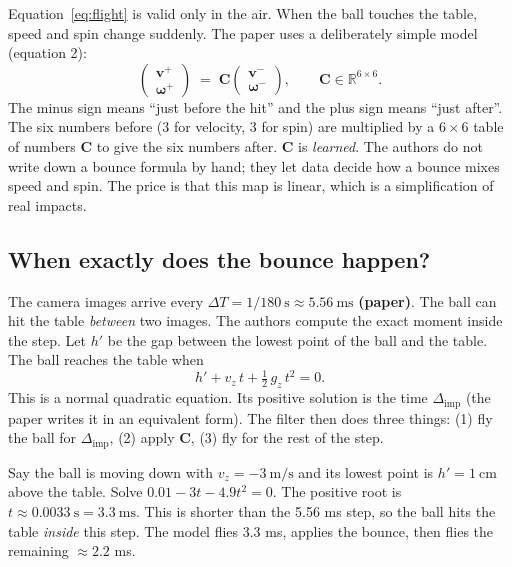 \documentclass[11pt,a4paper]{article}
\newcommand{\vv}{\mathbf{v}}
\newcommand{\ww}{\boldsymbol{\omega}}
\begin{document}
Equation~\eqref{eq:flight} is valid only in the air. When the ball touches the table, speed and
spin change suddenly. The paper uses a deliberately simple model (equation 2):
\begin{equation}
\begin{pmatrix}\vv^{+}\\ \ww^{+}\end{pmatrix}
\;=\; \mathbf C\begin{pmatrix}\vv^{-}\\ \ww^{-}\end{pmatrix},
\qquad \mathbf C\in\mathbb R^{6\times 6}.
\tag{P2}
\end{equation}
\noindent The minus sign means ``just before the hit'' and the plus sign means ``just after''. The
six numbers before (3 for velocity, 3 for spin) are multiplied by a $6\times6$ table of
numbers $\mathbf C$ to give the six numbers after. $\mathbf C$ is \emph{learned}. The authors
do not write down a bounce formula by hand; they let data decide how a bounce mixes speed and
spin. The price is that this map is linear, which is a simplification of real impacts.

\subsection*{When exactly does the bounce happen?}
The camera images arrive every $\Delta T = 1/180\ \text{s}\approx 5.56\ \text{ms}$ \textbf{(paper)}.
The ball can hit the table \emph{between} two images. The authors compute the exact moment
inside the step. Let $h'$ be the gap between the lowest point of the ball and the table. The ball
reaches the table when
\begin{equation*}
h' + v_z\,t + \tfrac12\,g_z\,t^2 = 0 .
\end{equation*}
\noindent This is a normal quadratic equation. Its positive solution is the time $\Delta_{\text{imp}}$ (the
paper writes it in an equivalent form). The filter then does three things: (1) fly the ball
for $\Delta_{\text{imp}}$, (2) apply $\mathbf C$, (3) fly for the rest of the step.

\begin{toy}
Say the ball is moving down with $v_z=-3\ \text{m/s}$ and its lowest point is $h'=1\ \text{cm}$
above the table. Solve $0.01-3t-4.9t^2=0$. The positive root is $t\approx 0.0033\ \text{s}=3.3\ \text{ms}$.
This is shorter than the 5.56 ms step, so the ball hits the table \emph{inside} this step.
The model flies 3.3 ms, applies the bounce, then flies the remaining $\approx 2.2$ ms.
\end{toy}
\end{document}
